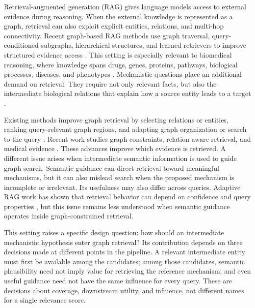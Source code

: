\documentclass{article} %
\begin{document}
Retrieval-augmented generation (RAG) gives language models access to external
evidence during reasoning. When the external knowledge is represented as a
graph, retrieval can also exploit explicit entities, relations, and multi-hop
connectivity. Recent graph-based RAG methods use graph traversal,
query-conditioned subgraphs, hierarchical structures, and learned retrievers
to improve structured evidence access
\citep{sun2024tog,ma2025tog2,he2024gretriever,
mavromatis2025gnnrag,li2025subgraphrag,zhang2025sirerag,
zhuang2026linearrag,luo2026greasoner}.
This setting is especially relevant to biomedical reasoning, where knowledge
spans drugs, genes, proteins, pathways, biological processes, diseases, and
phenotypes
\citep{himmelstein2017hetionet,chandak2023primekg}.
Mechanistic questions place an additional demand on retrieval. They require
not only relevant facts, but also the intermediate biological relations that
explain how a source entity leads to a target
\citep{gonzalez2023drugmechdb,callaghan2023biothings,joy2026bterag}.

Existing methods improve graph retrieval by selecting relations or entities,
ranking query-relevant graph regions, and adapting graph organization or
search to the query
\citep{zhou2026qafd,zhao2026toporag}.
Recent work studies graph constraints, relation-aware retrieval, and medical evidence
\citep{luo2025gcr,wu2025medgraphrag,um2026rporag}.
These advances improve which evidence is retrieved. A different issue arises
when intermediate semantic information is used to guide graph search.
Semantic guidance can direct retrieval toward meaningful mechanisms, but it
can also mislead search when the proposed mechanism is incomplete or
irrelevant. Its usefulness may also differ across queries. Adaptive RAG work
has shown that retrieval behavior can depend on confidence and query
properties
\citep{jiang2023flare,asai2024selfrag,jeong2024adaptiverag}, but this issue
remains less understood when semantic guidance operates inside
graph-constrained retrieval.

This setting raises a specific design question: how should an intermediate
mechanistic hypothesis enter graph retrieval? Its contribution depends on
three decisions made at different points in the pipeline. A relevant
intermediate entity must first be available among the candidates; among those
candidates, semantic plausibility need not imply value for retrieving the
reference mechanism; and even useful guidance need not have the same influence
for every query. These are decisions about coverage, downstream utility, and
influence, not different names for a single relevance score.
\end{document}
